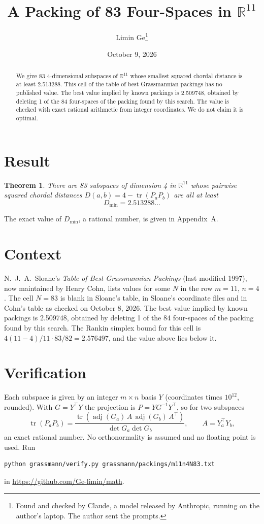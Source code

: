 \documentclass[11pt,a4paper]{article}
\title{A Packing of 83 Four-Spaces in $\mathbb{R}^{11}$}
\author{Limin Ge\thanks{Found and checked by Claude, a model released by Anthropic, running on the author's laptop. The author sent the prompts.}}
\date{October 9, 2026}
\newtheorem*{theorem}{Theorem}
\begin{document}
\maketitle
\begin{abstract}
We give 83 4-dimensional subspaces of $\mathbb{R}^{11}$ whose smallest squared chordal distance is at least 2.513288. This cell of the table of best Grassmannian packings has no published value. The best value implied by known packings is 2.509748, obtained by deleting 1 of the 84 four-spaces of the packing found by this search. The value is checked with exact rational arithmetic from integer coordinates. We do not claim it is optimal.
\end{abstract}

\section{Result}
\begin{theorem}
There are 83 subspaces of dimension 4 in $\mathbb{R}^{11}$ whose pairwise squared chordal distances $D(a,b) = 4 - \operatorname{tr}(P_aP_b)$ are all at least
\[ D_{\min} = 2.513288\ldots \]
\end{theorem}
The exact value of $D_{\min}$, a rational number, is given in Appendix~A.


\section{Context}
N.~J.~A.~Sloane's \emph{Table of Best Grassmannian Packings} (last modified 1997), now maintained by Henry Cohn, lists values for some $N$ in the row $m=11$, $n=4$. The cell $N=83$ is blank in Sloane's table, in Sloane's coordinate files and in Cohn's table as checked on October 8, 2026. The best value implied by known packings is 2.509748, obtained by deleting 1 of the 84 four-spaces of the packing found by this search. The Rankin simplex bound for this cell is $4(11-4)/11\cdot 83/82 = 2.576497$, and the value above lies below it.


\section{Verification}
Each subspace is given by an integer $m\times n$ basis $Y$ (coordinates times $10^{12}$, rounded). With $G=Y^\top Y$ the projection is $P=YG^{-1}Y^\top$, so for two subspaces
\[ \operatorname{tr}(P_aP_b)=\frac{\operatorname{tr}(\operatorname{adj}(G_a)\,A\,\operatorname{adj}(G_b)\,A^\top)}{\det G_a\det G_b},\qquad A=Y_a^\top Y_b, \]
an exact rational number. No orthonormality is assumed and no floating point is used. Run
\begin{verbatim}
python grassmann/verify.py grassmann/packings/m11n4N83.txt
\end{verbatim}
in \url{https://github.com/Ge-limin/math}.
\end{document}
